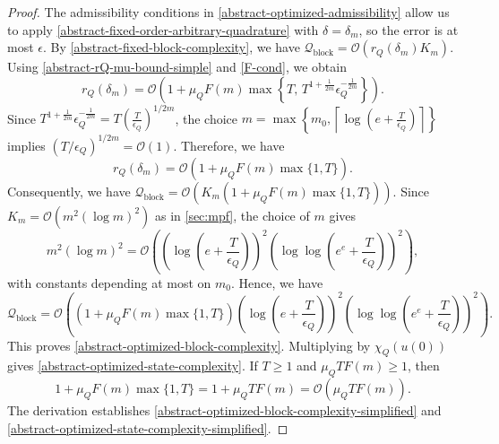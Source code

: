 \documentclass[10pt,reqno]{article}
\numberwithin{equation}{section}
\theoremstyle{plain}
\theoremstyle{definition}
\begin{document}
\begin{proof}
The admissibility conditions in \cref{abstract-optimized-admissibility} allow us to apply \cref{abstract-fixed-order-arbitrary-quadrature} with \(\delta=\delta_m\), so the error is at most \(\epsilon\). By \cref{abstract-fixed-block-complexity}, we have $\mathcal Q_{\operatorname{block}} = \mathcal O(r_Q(\delta_m)K_m)$.  Using \cref{abstract-rQ-mu-bound-simple} and \cref{F-cond}, we obtain
\begin{equation}
r_Q(\delta_m) = \mathcal O\left( 1+ \mu_QF(m) \max\left\{ T,\, T^{1+\frac1{2m}}\epsilon_Q^{-\frac1{2m}} \right\} \right).
\label{abstract-rQ-corrected-bound-in-proof}
\end{equation}
Since $T^{1+\frac1{2m}}\epsilon_Q^{-\frac1{2m}} = T\left(\frac{T}{\epsilon_Q}\right)^{1/2m}$,  the choice $m = \max\left\{ m_0, \left\lceil \log\left(e+\frac{T}{\epsilon_Q}\right) \right\rceil \right\}$ implies $(T/\epsilon_Q)^{1/2m} = \mathcal O(1)$. Therefore, we have
\begin{equation}
r_Q(\delta_m) = \mathcal O\left( 1+\mu_QF(m)\max\{1,T\} \right).
\label{abstract-rQ-optimized-corrected}
\end{equation}
Consequently, we have $\mathcal Q_{\operatorname{block}} = \mathcal O\left( K_m\left(1+\mu_QF(m)\max\{1,T\}\right) \right)$. 
Since \(K_m=\mathcal O(m^2(\log m)^2)\) as in \cref{sec:mpf}, the choice of \(m\) gives
\begin{equation}
m^2(\log m)^2 = \mathcal O\left( \left(\log\left(e+\frac{T}{\epsilon_Q}\right)\right)^2 \left(\log\log\left(e^e+\frac{T}{\epsilon_Q}\right)\right)^2 \right),
\label{abstract-Km-optimized-bound}
\end{equation}
with constants depending at most on \(m_0\). Hence, we have
\begin{equation}
\mathcal Q_{\operatorname{block}} = \mathcal O\left( \left(1+\mu_QF(m)\max\{1,T\}\right) \left(\log\left(e+\frac{T}{\epsilon_Q}\right)\right)^2 \left(\log\log\left(e^e+\frac{T}{\epsilon_Q}\right)\right)^2 \right).
\label{abstract-Qblock-optimized-proof-final}
\end{equation}
This proves \cref{abstract-optimized-block-complexity}. Multiplying by \(\chi_Q(u(0))\) gives \cref{abstract-optimized-state-complexity}. If \(T\geq1\) and \(\mu_QTF(m)\geq1\), then
\begin{equation}
1+\mu_QF(m)\max\{1,T\} = 1+\mu_QTF(m) = \mathcal O(\mu_QTF(m)).
\label{abstract-simplified-F-factor}
\end{equation}
The derivation establishes \cref{abstract-optimized-block-complexity-simplified} and \cref{abstract-optimized-state-complexity-simplified}.
\end{proof}
\end{document}
